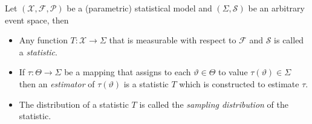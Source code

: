 \documentclass[ 11pt,%
				a4paper,%
				twoside,%
				headinclude,%
				footinclude = true,%
				cleardoublepage = empty,%
				reqno]{scrbook}
\begin{document}
\begin{definition}
Let $\left(\mathcal{X}, \mathscr{F}, \mathcal{P}\right)$ be a (parametric) statistical model and $(\Sigma, \mathscr{S})$ be an arbitrary event space, then

\begin{itemize}
    \item[\cdefn{(a)}] Any function $T: \mathcal{X} \rightarrow \Sigma$ that is measurable with respect to $\mathscr{F}$ and $\mathscr{S}$ is called a \emph{statistic}.

    \item[\cdefn{(b)}] If $\tau: \Theta \rightarrow \Sigma$ be a mapping that assigns to each $\vartheta \in \Theta$ to value $\tau(\vartheta) \in \Sigma$ then an \emph{estimator} of $\tau(\vartheta)$ is a statistic $T$ which is constructed to estimate $\tau$. 



    \item[\cdefn{(c)}] The distribution of a statistic $T$ is called the \emph{sampling distribution} of the statistic.
\end{itemize}
    
\end{definition}
\end{document}
